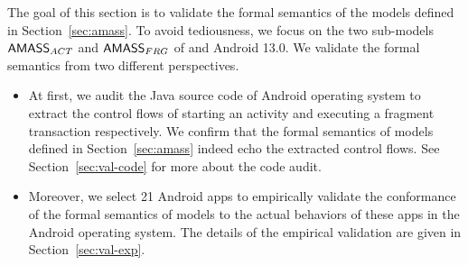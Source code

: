 

The goal of this section is to validate the formal semantics of the {\AMASS} models defined in Section~\ref{sec:amass}.  
To avoid tediousness, we focus on the two sub-models $\textsf{AMASS}_{ACT}$ and $\textsf{AMASS}_{FRG}$ of {\AMASS} %
and Android 13.0. 
%
We validate the formal semantics from two different perspectives. 
\begin{itemize}
\item At first, we audit the Java source code of Android operating system to extract the control flows of starting an activity and executing a fragment transaction respectively. We confirm that the formal semantics of {\AMASS} models defined in Section~\ref{sec:amass} indeed echo the extracted control flows. See Section~\ref{sec:val-code} for more about the code audit. 
%
\item Moreover, we select 21 Android apps to empirically validate the conformance of the formal semantics of {\AMASS} models to the actual behaviors of these apps in the Android operating system. The details of the empirical validation are given in Section~\ref{sec:val-exp}. 
\end{itemize}


